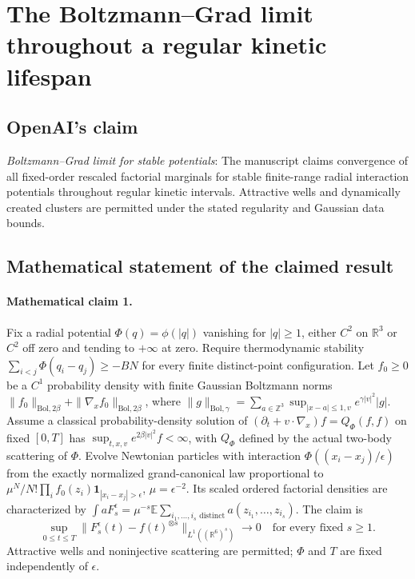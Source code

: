 \documentclass[11pt]{article}
\begin{document}
\section*{The Boltzmann–Grad limit throughout a regular kinetic lifespan}

\subsection{OpenAI's claim}
\textit{Boltzmann--Grad limit for stable potentials}: The manuscript claims convergence of all fixed-order rescaled factorial marginals for stable finite-range radial interaction potentials throughout regular kinetic intervals. Attractive wells and dynamically created clusters are permitted under the stated regularity and Gaussian data bounds.

\subsection{Mathematical statement of the claimed result}
\paragraph{Mathematical claim 1.} Fix a radial potential $\Phi(q)=\phi(|q|)$ vanishing for $|q|\ge1$, either $C^2$ on $\mathbb R^3$ or $C^2$ off zero and tending to $+\infty$ at zero. Require thermodynamic stability $\sum_{i<j}\Phi(q_i-q_j)\ge-BN$ for every finite distinct-point configuration. Let $f_0\ge0$ be a $C^1$ probability density with finite Gaussian Boltzmann norms $\|f_0\|_{\mathrm{Bol},2\beta}+\|\nabla_xf_0\|_{\mathrm{Bol},2\beta}$, where $\|g\|_{\mathrm{Bol},\gamma}=\sum_{a\in\mathbb Z^3}\sup_{|x-a|\le1,v}e^{\gamma|v|^2}|g|$. Assume a classical probability-density solution of $(\partial_t+v\cdot\nabla_x)f=Q_\Phi(f,f)$ on fixed $[0,T]$ has $\sup_{t,x,v}e^{2\beta|v|^2}f<\infty$, with $Q_\Phi$ defined by the actual two-body scattering of $\Phi$. Evolve Newtonian particles with interaction $\Phi((x_i-x_j)/\epsilon)$ from the exactly normalized grand-canonical law proportional to $\mu^N/N!\prod_if_0(z_i)\mathbf1_{|x_i-x_j|>\epsilon}$, $\mu=\epsilon^{-2}$. Its scaled ordered factorial densities are characterized by $\int aF_s^\epsilon=\mu^{-s}\mathbb E\sum_{i_1,\ldots,i_s\text{ distinct}}a(z_{i_1},\ldots,z_{i_s})$. The claim is \[\sup_{0\le t\le T}\|F_s^\epsilon(t)-f(t)^{\otimes s}\|_{L^1((\mathbb R^6)^s)}\longrightarrow0\quad\text{for every fixed }s\ge1.\] Attractive wells and noninjective scattering are permitted; $\Phi$ and $T$ are fixed independently of $\epsilon$.
\end{document}
